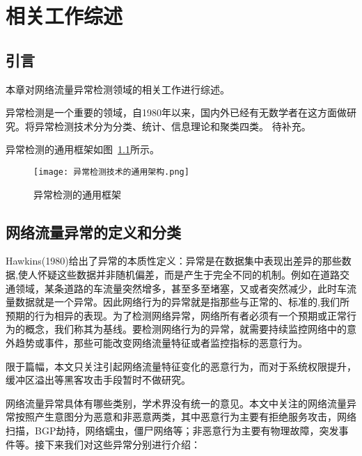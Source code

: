 
\chapter{相关工作综述}

\section{引言}

本章对网络流量异常检测领域的相关工作进行综述。



异常检测是一个重要的领域，自1980年以来，国内外已经有无数学者在这方面做研究。\citet{ahmed2016survey}将异常检测技术分为分类、统计、信息理论和聚类四类。
待补充。

异常检测的通用框架如图~\ref{fig:scheme}所示。

\begin{figure}
    \centering
    \texttt{[image: 异常检测技术的通用架构.png]}
    \caption{异常检测的通用框架}
    \label{fig:scheme}
  \end{figure}




\section{网络流量异常的定义和分类}
Hawkins(1980)给出了异常的本质性定义\cite{hawkins1980identification}：异常是在数据集中表现出差异的那些数据,使人怀疑这些数据并非随机偏差，而是产生于完全不同的机制。例如在道路交通领域，某条道路的车流量突然增多，甚至多至堵塞，又或者突然减少，此时车流量数据就是一个异常。因此网络行为的异常就是指那些与正常的、标准的,我们所预期的行为相异的表现。为了检测网络异常，网络所有者必须有一个预期或正常行为的概念，我们称其为基线。要检测网络行为的异常，就需要持续监控网络中的意外趋势或事件，那些可能改变网络流量特征或者监控指标的恶意行为。


限于篇幅，本文只关注引起网络流量特征变化的恶意行为，而对于系统权限提升，缓冲区溢出等黑客攻击手段暂时不做研究。


网络流量异常具体有哪些类别，学术界没有统一的意见。本文中关注的网络流量异常按照产生意图分为恶意和非恶意两类，其中恶意行为主要有拒绝服务攻击，网络扫描，BGP劫持，网络蠕虫，僵尸网络等；非恶意行为主要有物理故障，突发事件等。接下来我们对这些异常分别进行介绍：

